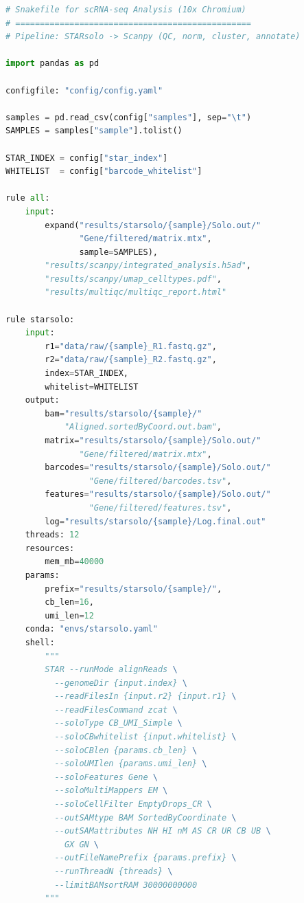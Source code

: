 \begin{lstlisting}[language=Python, caption={Snakemake workflow for 10x
Chromium scRNA-seq analysis using STARsolo and Scanpy.},
label={lst:scrnaseq:snakemake}]
# Snakefile for scRNA-seq Analysis (10x Chromium)
# ================================================
# Pipeline: STARsolo -> Scanpy (QC, norm, cluster, annotate)

import pandas as pd

configfile: "config/config.yaml"

samples = pd.read_csv(config["samples"], sep="\t")
SAMPLES = samples["sample"].tolist()

STAR_INDEX = config["star_index"]
WHITELIST  = config["barcode_whitelist"]

rule all:
    input:
        expand("results/starsolo/{sample}/Solo.out/"
               "Gene/filtered/matrix.mtx",
               sample=SAMPLES),
        "results/scanpy/integrated_analysis.h5ad",
        "results/scanpy/umap_celltypes.pdf",
        "results/multiqc/multiqc_report.html"

rule starsolo:
    input:
        r1="data/raw/{sample}_R1.fastq.gz",
        r2="data/raw/{sample}_R2.fastq.gz",
        index=STAR_INDEX,
        whitelist=WHITELIST
    output:
        bam="results/starsolo/{sample}/"
            "Aligned.sortedByCoord.out.bam",
        matrix="results/starsolo/{sample}/Solo.out/"
               "Gene/filtered/matrix.mtx",
        barcodes="results/starsolo/{sample}/Solo.out/"
                 "Gene/filtered/barcodes.tsv",
        features="results/starsolo/{sample}/Solo.out/"
                 "Gene/filtered/features.tsv",
        log="results/starsolo/{sample}/Log.final.out"
    threads: 12
    resources:
        mem_mb=40000
    params:
        prefix="results/starsolo/{sample}/",
        cb_len=16,
        umi_len=12
    conda: "envs/starsolo.yaml"
    shell:
        """
        STAR --runMode alignReads \
          --genomeDir {input.index} \
          --readFilesIn {input.r2} {input.r1} \
          --readFilesCommand zcat \
          --soloType CB_UMI_Simple \
          --soloCBwhitelist {input.whitelist} \
          --soloCBlen {params.cb_len} \
          --soloUMIlen {params.umi_len} \
          --soloFeatures Gene \
          --soloMultiMappers EM \
          --soloCellFilter EmptyDrops_CR \
          --outSAMtype BAM SortedByCoordinate \
          --outSAMattributes NH HI nM AS CR UR CB UB \
            GX GN \
          --outFileNamePrefix {params.prefix} \
          --runThreadN {threads} \
          --limitBAMsortRAM 30000000000
        """


\end{lstlisting}
